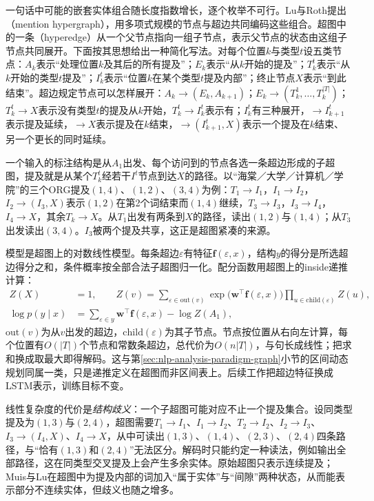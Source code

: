 一句话中可能的嵌套实体组合随长度指数增长，逐个枚举不可行。Lu与Roth提出（mention hypergraph），用多项式规模的节点与超边共同编码这些组合。超图中的一条（hyperedge）从一个父节点指向一组子节点，表示父节点的状态由这组子节点共同展开。下面按其思想给出一种简化写法。对每个位置$k$与类型$t$设五类节点：$A_k$表示“处理位置$k$及其后的所有提及”；$E_k$表示“从$k$开始的提及”；$T_k^t$表示“从$k$开始的类型$t$提及”；$I_k^t$表示“位置$k$在某个类型$t$提及内部”；终止节点$X$表示“到此结束”。超边规定节点可以怎样展开：$A_k\to(E_k,A_{k+1})$；$E_k\to(T_k^{1},\ldots,T_k^{|T|})$；$T_k^t\to X$表示没有类型$t$的提及从$k$开始，$T_k^t\to I_k^t$表示有；$I_k^t$有三种展开，$\to I_{k+1}^t$表示提及延续，$\to X$表示提及在$k$结束，$\to(I_{k+1}^t,X)$表示一个提及在$k$结束、另一个更长的同时延续。

一个输入的标注结构是从$A_1$出发、每个访问到的节点各选一条超边形成的子超图，提及就是从某个$T_k^t$经若干$I^t$节点到达$X$的路径。以“海棠／大学／计算机／学院”的三个ORG提及$(1,4)$、$(1,2)$、$(3,4)$为例：$T_1\to I_1$，$I_1\to I_2$，$I_2\to(I_3,X)$表示$(1,2)$在第2个词结束而$(1,4)$继续，$T_3\to I_3$，$I_3\to I_4$，$I_4\to X$，其余$T_k\to X$。从$T_1$出发有两条到$X$的路径，读出$(1,2)$与$(1,4)$；从$T_3$出发读出$(3,4)$。$I_3$被两个提及共享，这正是超图紧凑的来源。

模型是超图上的对数线性模型。每条超边$\varepsilon$有特征$\bm f(\varepsilon,x)$，结构$y$的得分是所选超边得分之和，条件概率按全部合法子超图归一化。配分函数用超图上的inside递推计算：
\begin{equation}
  \begin{aligned}
    Z(X)&=1,\qquad
    Z(v)=\sum_{\varepsilon\in\mathrm{out}(v)}\exp\bigl(\bm w^\top\bm f(\varepsilon,x)\bigr)\prod_{u\in\mathrm{child}(\varepsilon)}Z(u),\\
    \log p(y\mid x)&=\sum_{\varepsilon\in y}\bm w^\top\bm f(\varepsilon,x)-\log Z(A_1),
  \end{aligned}
  \label{eq:nlp-extraction-hypergraph-inside}
\end{equation}
$\mathrm{out}(v)$为从$v$出发的超边，$\mathrm{child}(\varepsilon)$为其子节点。节点按位置从右向左计算，每个位置有$O(|T|)$个节点和常数条超边，总代价为$O(n|T|)$，与句长成线性；把求和换成取最大即得解码。这与第\ref{sec:nlp-analysis-paradigm-graph}小节的区间动态规划同属一类，只是递推定义在超图而非区间表上。后续工作把超边特征换成LSTM表示，训练目标不变。

线性复杂度的代价是\emph{结构歧义}：一个子超图可能对应不止一个提及集合。设同类型提及为$(1,3)$与$(2,4)$，超图需要$T_1\to I_1$、$I_1\to I_2$、$T_2\to I_2$、$I_2\to I_3$、$I_3\to(I_4,X)$、$I_4\to X$，从中可读出$(1,3)$、$(1,4)$、$(2,3)$、$(2,4)$四条路径，与“恰有$(1,3)$和$(2,4)$”无法区分。解码时只能约定一种读法，例如输出全部路径，这在同类型交叉提及上会产生多余实体。原始超图只表示连续提及；Muis与Lu在超图中为提及内部的词加入“属于实体”与“间隙”两种状态，从而能表示部分不连续实体，但歧义也随之增多。


